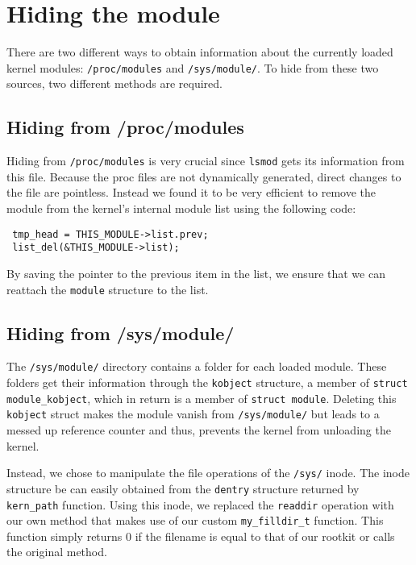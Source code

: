 \section{Hiding the module}
There are two different ways to obtain information about the currently loaded 
kernel modules: \texttt{/proc/modules} and \texttt{/sys/module/}. To hide from 
these two sources, two different methods are required.
\subsection{Hiding from /proc/modules}
Hiding from \texttt{/proc/modules} is very crucial since \texttt{lsmod} gets 
its information from this file. Because the proc files are not dynamically 
generated, direct changes to the file are pointless. Instead we found it to be 
very efficient to remove the module from the kernel's internal module list 
using the following code:
\begin{lstlisting}
 tmp_head = THIS_MODULE->list.prev;
 list_del(&THIS_MODULE->list);	
\end{lstlisting}
By saving the pointer to the previous item in the list, we ensure that we can 
reattach the \texttt{module} structure to the list.

\subsection{Hiding from /sys/module/}
The \texttt{/sys/module/} directory contains a folder for each loaded module. 
These folders get their information through the \texttt{kobject} structure, a 
member of \texttt{struct module\_kobject}, which in return is a member of 
\texttt{struct module}. Deleting this \texttt{kobject} struct makes the module 
vanish from \texttt{/sys/module/} but leads to a messed up reference counter 
and thus, prevents the kernel from unloading the kernel.\par
Instead, we chose to manipulate the file operations of the \texttt{/sys/} 
inode. The inode structure be can easily obtained from the \texttt{dentry} 
structure returned by \texttt{kern\_path} function. Using this inode, we 
replaced the \texttt{readdir} operation with our own method that makes use of 
our custom \texttt{my\_filldir\_t} function. This  function simply returns 0 if 
the filename is equal to that of our rootkit or calls the original method.